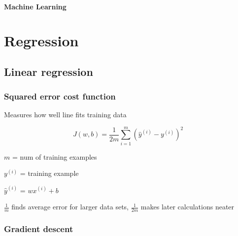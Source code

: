 \documentclass[12pt]{article}
\begin{document}
\newcommand*\dif{\mathop{}\!\mathrm{d}}

\newenvironment{myitemize}
{ \begin{itemize}
    \setlength{\itemsep}{0pt}
    \setlength{\parskip}{0pt}
    \setlength{\parsep}{0pt}     }
{ \end{itemize}                  } 

\newenvironment{myenumerate}
{ \begin{enumerate}
    \setlength{\itemsep}{0pt}
    \setlength{\parskip}{0pt}
    \setlength{\parsep}{0pt}     }
{ \end{enumerate}                  } 

\begin{titlepage}
\begin{center}
\vspace*{2cm}
\begin{huge}\textbf{Machine Learning}\end{huge}
\end{center}
\end{titlepage}

\tableofcontents


\pagebreak

\section{Regression}
\subsection{Linear regression}
\subsubsection{Squared error cost function}

Measures how well line fits training data

\[ J(w,b) = \frac{1}{2m} \sum_{i=1}^m ({\hat y}^{(i)} - y^{(i)})^2 \]

$m$ = num of training examples

$y^{(i)}$ = training example

${\hat y}^{(i)}$ = $wx^{(i)} + b$

$\frac{1}{m}$ finds average error for larger data sets, $\frac{1}{2m}$ makes later calculations neater

\subsubsection{Gradient descent}
\end{document}
